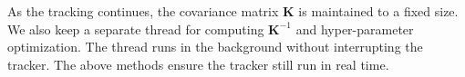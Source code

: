 As the tracking continues, the covariance matrix $\mathbf{K}$ is maintained to a fixed size. 
We also keep a separate thread for computing $\mathbf{K}^{-1}$ and hyper-parameter optimization. 
The thread runs in the background without interrupting the tracker.
The above methods ensure the tracker still run in real time.
